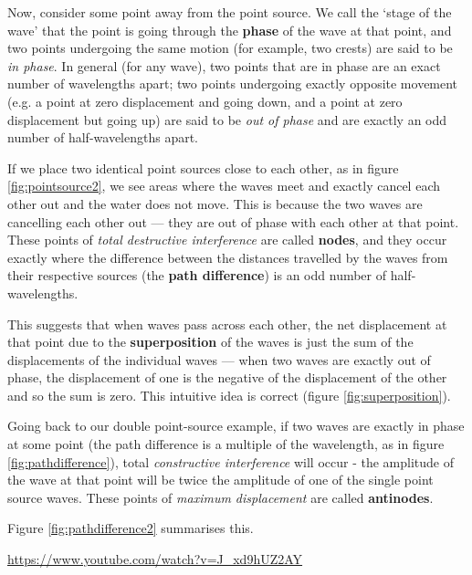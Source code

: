 \documentclass[a4paper]{amsbook}
\begin{document}
Now, consider some point away from the point source. We call the `stage of the wave' that the point is going through the \textbf{phase} of
the wave at that point, and two points undergoing the same motion (for example, two crests) are said to be \textit{in phase}.
In general (for any wave), two points that are in phase are an exact number of wavelengths apart; two points undergoing exactly opposite
movement (e.g. a point at zero displacement and going down, and a point at zero displacement but going up) are said to be \textit{out of phase}
and are exactly an odd number of half-wavelengths apart.

If we place two identical point sources close to each other, as in figure \ref{fig:pointsource2}, we see areas where the waves meet and exactly cancel
each other out and the water does not move. This is because the two waves are cancelling each other out --- they are out of phase with each other at
that point. These points of \textit{total destructive interference} are called \textbf{nodes}, and they occur exactly where the difference between the
distances travelled by the waves from their respective sources (the \textbf{path difference}) is an odd number of half-wavelengths.

This suggests that when waves pass across each other, the net displacement at that point due to the \textbf{superposition} of the waves is just the sum
of the displacements of the individual waves --- when two waves are exactly out of phase, the displacement of one is the negative of the displacement
of the other and so the sum is zero. This intuitive idea is correct (figure \ref{fig:superposition}).

Going back to our double point-source example, if two waves are exactly in phase at some point (the path difference is a multiple of the wavelength, as
in figure \ref{fig:pathdifference}), total \textit{constructive interference} will occur - the amplitude of the wave at that point will be twice
the amplitude of one of the single point source waves. These points of \textit{maximum displacement} are called \textbf{antinodes}.

Figure \ref{fig:pathdifference2} summarises this.

\begin{center}
\begin{tcolorbox}[width=0.8\textwidth,colback={red},title={\textbf{Go and watch...}},colbacktitle=yellow,coltitle=blue]
  \textcolor{white}{\url{https://www.youtube.com/watch?v=J_xd9hUZ2AY}}
\end{tcolorbox}
\end{center}
\end{document}
